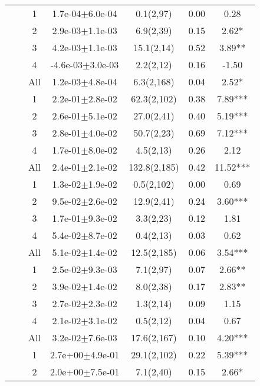 \begin{longtable}{llccccS[table-format=-2.2, table-space-text-post = {***}]}
   \midrule
{} & {} & 1 &  1.7e-04$\pm$6.0e-04 & 0.1(2,97) & 0.00 & 0.28 \\ 
   &  & 2 &  2.9e-03$\pm$1.1e-03 & 6.9(2,39) & 0.15 & 2.62* \\ 
   &  & 3 &  4.2e-03$\pm$1.1e-03 & 15.1(2,14) & 0.52 & 3.89** \\ 
   &  & 4 & -4.6e-03$\pm$3.0e-03 & 2.2(2,12) & 0.16 & -1.50 \\ 
   &  & All &  1.2e-03$\pm$4.8e-04 & 6.3(2,168) & 0.04 & 2.52* \\ 
   \midrule
{} & {} & 1 &  2.2e-01$\pm$2.8e-02 & 62.3(2,102) & 0.38 & 7.89*** \\ 
   &  & 2 &  2.6e-01$\pm$5.1e-02 & 27.0(2,41) & 0.40 & 5.19*** \\ 
   &  & 3 &  2.8e-01$\pm$4.0e-02 & 50.7(2,23) & 0.69 & 7.12*** \\ 
   &  & 4 &  1.7e-01$\pm$8.0e-02 & 4.5(2,13) & 0.26 & 2.12 \\ 
   &  & All &  2.4e-01$\pm$2.1e-02 & 132.8(2,185) & 0.42 & 11.52*** \\ 
   \midrule
{} & {} & 1 &  1.3e-02$\pm$1.9e-02 & 0.5(2,102) & 0.00 & 0.69 \\ 
   &  & 2 &  9.5e-02$\pm$2.6e-02 & 12.9(2,41) & 0.24 & 3.60*** \\ 
   &  & 3 &  1.7e-01$\pm$9.3e-02 & 3.3(2,23) & 0.12 & 1.81 \\ 
   &  & 4 &  5.4e-02$\pm$8.7e-02 & 0.4(2,13) & 0.03 & 0.62 \\ 
   &  & All &  5.1e-02$\pm$1.4e-02 & 12.5(2,185) & 0.06 & 3.54*** \\ 
   \midrule
{} & {} & 1 &  2.5e-02$\pm$9.3e-03 & 7.1(2,97) & 0.07 & 2.66** \\ 
   &  & 2 &  3.9e-02$\pm$1.4e-02 & 8.0(2,38) & 0.17 & 2.83** \\ 
   &  & 3 &  2.7e-02$\pm$2.3e-02 & 1.3(2,14) & 0.09 & 1.15 \\ 
   &  & 4 &  2.1e-02$\pm$3.1e-02 & 0.5(2,12) & 0.04 & 0.67 \\ 
   &  & All &  3.2e-02$\pm$7.6e-03 & 17.6(2,167) & 0.10 & 4.20*** \\ 
   \midrule
{} & {} & 1 &  2.7e+00$\pm$4.9e-01 & 29.1(2,102) & 0.22 & 5.39*** \\ 
   &  & 2 &  2.0e+00$\pm$7.5e-01 & 7.1(2,40) & 0.15 & 2.66* \\ 

\end{longtable}
